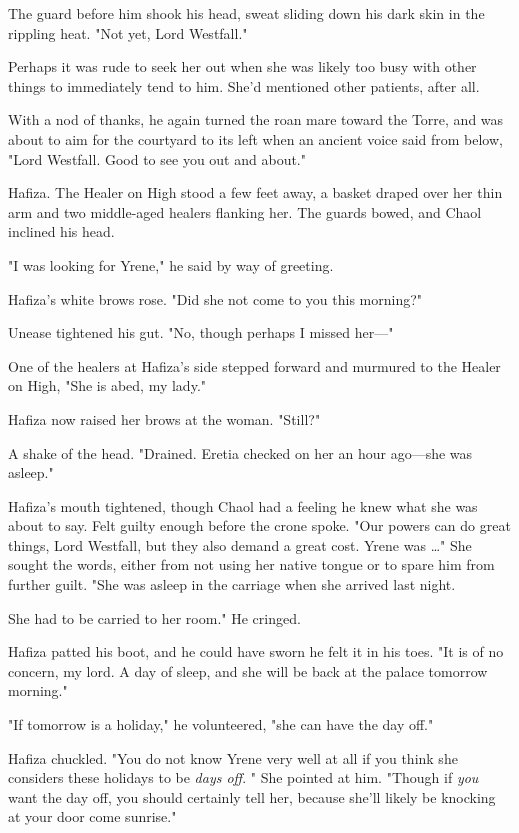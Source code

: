 The guard before him shook his head, sweat sliding down his dark skin in the rippling heat.
"Not yet, Lord Westfall."

Perhaps it was rude to seek her out when she was likely too busy with other things to immediately tend to him.
She'd mentioned other patients, after all.

With a nod of thanks, he again turned the roan mare toward the Torre, and was about to aim for the courtyard to its left when an ancient voice said from below, "Lord Westfall.
Good to see you out and about."

Hafiza.
The Healer on High stood a few feet away, a basket draped over her thin arm and two middle-aged healers flanking her.
The guards bowed, and Chaol inclined his head.

"I was looking for Yrene," he said by way of greeting.

Hafiza's white brows rose.
"Did she not come to you this morning?"

Unease tightened his gut.
"No, though perhaps I missed her---"

One of the healers at Hafiza's side stepped forward and murmured to the Healer on High, "She is abed, my lady."

Hafiza now raised her brows at the woman.
"Still?"

A shake of the head.
"Drained.
Eretia checked on her an hour ago---she was asleep."

Hafiza's mouth tightened, though Chaol had a feeling he knew what she was about to say.
Felt guilty enough before the crone spoke.
"Our powers can do great things, Lord Westfall, but they also demand a great cost.
Yrene was \ldots" She sought the words, either from not using her native tongue or to spare him from further guilt.
"She was asleep in the carriage when she arrived last night.

She had to be carried to her room."
He cringed.

Hafiza patted his boot, and he could have sworn he felt it in his toes.
"It is of no concern, my lord.
A day of sleep, and she will be back at the palace tomorrow morning."

"If tomorrow is a holiday," he volunteered, "she can have the day off."

Hafiza chuckled.
"You do not know Yrene very well at all if you think she considers these holidays to be \emph{days off}.
" She pointed at him.
"Though if \emph{you} want the day off, you should certainly tell her, because she'll likely be knocking at your door come sunrise."

